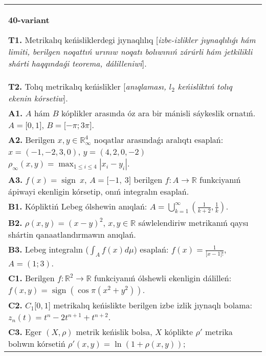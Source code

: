 \documentclass{article}
\DeclareMathOperator{\sign}{sign}
\begin{document}
\begin{tabular}{m{17cm}}
\textbf{40-variant}
\newline

\textbf{T1.} Metrikalıq keńisliklerdegi jıynaqlılıq [\textit{izbe-izlikler jıynaqlılıǵı hám limiti, berilgen noqattıń urınıw noqatı bolıwınıń zárúrli hám jetkilikli shárti haqqındaǵi teorema, dálilleniwi}]. \\
\textbf{T2.} Tolıq metrikalıq keńislikler [\textit{anıqlaması, \(l_{2}\) keńisliktıń tolıq ekenin kórsetiw}]. \\
\textbf{A1.} \(A\) hám \(B\) kóplikler arasında óz ara bir mánisli sáykeslik ornatıń. \(A = \lbrack 0,1\rbrack\), \(B = \lbrack - \pi;3\pi\rbrack\). \\
\textbf{A2.} Berilgen \(x,y \in \mathbb{R}_{\infty}^{4}\) noqatlar arasındaǵı aralıqtı esaplań: \(x = ( - 1, - 2,3,0)\), \(y = (4,2,0, - 2)\) \(\rho_{\infty}(x,y) = \max_{1 \leq i \leq 4}\left| x_{i} - y_{i} \right|\). \\
\textbf{A3.} \(f(x) = \sign \ x\), \(A = \lbrack - 1,\ 3\rbrack\) berilgen \(f:A\rightarrow\mathbb{R}\) funkciyanıń ápiwayi ekenligin kórsetip, onıń integralın esaplań. \\
\textbf{B1.} Kópliktiń Lebeg ólshewin anıqlań: \(A = \bigcup_{k = 1}^{\infty}\left( \frac{1}{k + 2},\frac{1}{k} \right)\). \\
\textbf{B2.} \(\rho(x,y) = (x - y)^{2}\), \(x,y\mathbb{\in R}\) sáwlelendiriw metrikanıń qaysı shártin qanaatlandırmawın anıqlań. \\
\textbf{B3.} Lebeg integralın (\(\int_{A}^{}{f(x)d\mu}\)) esaplań: \(f(x) = \frac{1}{\lbrack x - 1\rbrack!}\), \(A = (1;3)\). \\
\textbf{C1.} Berilgen \(f:\mathbb{R}^{2}\mathbb{\rightarrow R}\) funkciyanıń ólshewli ekenligin dálilleń: \(f(x,y) = \sign\left( \cos\pi\left( x^{2} + y^{2} \right) \right)\). \\
\textbf{C2.} \(C_{1}\lbrack 0,1\rbrack\) metrikalıq keńislikte berilgen izbe izlik jıynaqlı bolama: \(z_{n}(t) = t^{n} - 2t^{n + 1} + t^{n + 2}\). \\
\textbf{C3.} Eger \((X,\rho)\) metrik keńislik bolsa, \(X\) kóplikte \(\rho'\) metrika bolıwın kórsetiń \(\rho'(x,y) = \ln\left( 1 + \rho(x,y) \right)\); \\

\end{tabular}
\vspace{1cm}
\end{document}
